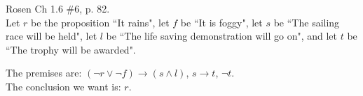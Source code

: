 \begin{questions}



{}  Rosen Ch 1.6 \#6, p. 82.\\
Let $r$ be the proposition ``It rains", let $f$ be ``It is foggy",
    let $s$ be ``The sailing race will be held", let $l$ be ``The life
    saving demonstration will go on", and let $t$ be ``The trophy will
    be awarded".
    \ifprintanswers
        \vspace{-10pt}
    \fi
\begin{solution}
    The premises are: $(\neg r \vee \neg f) \rightarrow (s \wedge l)$, $s \rightarrow t$, $\neg t$. \\
    The conclusion we want is: $r$.


\end{solution}
\end{questions}
